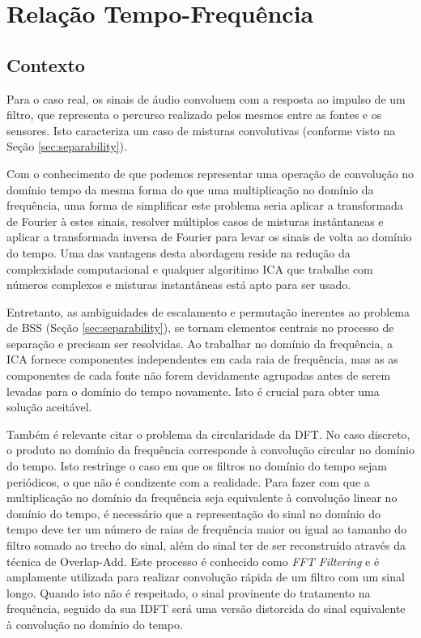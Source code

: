 \label{chap:3}

\section{Relação Tempo-Frequência}
    
    \subsection{Contexto}
        Para o caso real, os sinais de áudio convoluem com a resposta ao impulso de um filtro, que representa o percurso realizado pelos mesmos entre as fontes e os sensores. Isto caracteriza um caso de misturas convolutivas (conforme visto na Seção \ref{sec:separability}). 
        
        Com o conhecimento de que podemos representar uma operação de convolução no domínio tempo da mesma forma do que uma multiplicação no domínio da frequência, uma forma de simplificar este problema seria aplicar a transformada de Fourier à estes sinais, resolver múltiplos casos de misturas instântaneas e aplicar a transformada inversa de Fourier para levar os sinais de volta ao domínio do tempo. Uma das vantagens desta abordagem reside na redução da complexidade computacional e qualquer algoritimo ICA que trabalhe com números complexos e misturas instantâneas está apto para ser usado.
        
        Entretanto, as ambiguidades de escalamento e permutação inerentes ao problema de BSS (Seção \ref{sec:separability}), se tornam elementos centrais no processo de separação e precisam ser resolvidas. Ao trabalhar no domínio da frequência, a ICA fornece componentes independentes em cada raia de frequência, mas as as componentes de cada fonte não forem devidamente agrupadas antes de serem levadas para o domínio do tempo novamente. Isto é crucial para obter uma solução aceitável.
        
        Também é relevante citar o problema da circularidade da DFT. No caso discreto, o produto no domínio da frequência corresponde à convolução circular no domínio do tempo. Isto restringe o caso em que os filtros no domínio do tempo sejam periódicos, o que não é condizente com a realidade. Para fazer com que a multiplicação no domínio da frequência seja equivalente à convolução linear no domínio do tempo, é necessário que a representação do sinal no domínio do tempo deve ter um número de raias de frequência maior ou igual ao tamanho do filtro somado ao trecho do sinal, além do sinal ter de ser reconstruído através da técnica de Overlap-Add. Este processo é conhecido como \textit{FFT Filtering} e é amplamente utilizada para realizar convolução rápida de um filtro com um sinal longo. Quando isto não é respeitado, o sinal provinente do tratamento na frequência, seguido da sua IDFT será uma versão distorcida do sinal equivalente à convolução no domínio do tempo.
        
